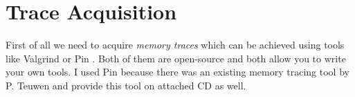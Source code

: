 \section{Trace Acquisition}

First of all we need to acquire {\em memory traces} which can be achieved using tools like Valgrind \cite{nethercote2007valgrind} or Pin \cite{luk2005pin}. Both of them are open-source and both allow you to write your own tools. I used Pin because there was an existing memory tracing tool by P. Teuwen \cite{teuwen2015movfuscator} and provide this tool on attached CD as well.

